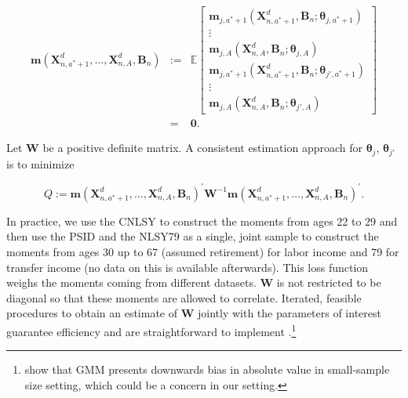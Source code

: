 \begin{eqnarray}
\bm{m} \left( \bm{X}_{n,a^*+1}^d, \ldots,  \bm{X}_{n,A}^d, \bm{B}_{n} \right) &:=& \mathbb{E}
\begin{bmatrix}
\bm{m}_{j,a^*+1} \left( \bm{X}_{n,a^*+1}^d, \bm{B}_{n}; \bm{\theta}_{j,a^*+1} \right) \\ \vdots \\  \bm{m}_{j,A} \left( \bm{X}_{n,A}^d, \bm{B}_{n}; \bm{\theta}_{j,A} \right) \\ \bm{m}_{j,a^*+1} \left( \bm{X}_{n,a^*+1}^d, \bm{B}_{n}; \bm{\theta}_{j',a^*+1} \right) \\ \vdots \\  \bm{m}_{j,A} \left( \bm{X}_{n,A}^d, \bm{B}_{n}; \bm{\theta}_{j',A} \right)
\end{bmatrix}  \\ \nonumber
&=& \bm{0}.
\end{eqnarray}

\noindent Let $\bm{W}$ be a positive definite matrix. A consistent estimation approach for $\bm{\theta}_{j}$, $\bm{\theta}_{j'}$ is to minimize 

\begin{equation}
Q :=  {\bm{m} \left( \bm{X}_{n,a^*+1}^d, \ldots,  \bm{X}_{n,A}^d, \bm{B}_{n} \right)}^{'} \bm{W} ^{-1} {\bm{m} \left( \bm{X}_{n,a^*+1}^d, \ldots,  \bm{X}_{n,A}^d, \bm{B}_{n} \right)^{'}}. \label{eq:wloss}
\end{equation}

\noindent In practice, we use the CNLSY to construct the moments from ages 22 to 29 and then use the PSID and the NLSY79 as a single, joint sample to construct the moments from ages 30 up to 67 (assumed retirement) for labor income and 79 for transfer income (no data on this is available afterwards). This loss function weighs the moments coming from different datasets. $\bm{W}$ is not restricted to be diagonal so that these moments are allowed to correlate. Iterated, feasible procedures to obtain an estimate of $\bm{W}$ jointly with the parameters of interest guarantee efficiency and are straightforward to implement \citep{Hansen_1982_Econometrica,Amemiya_1985_advanced}.\footnote{\citet{Altonji_Segal_1996_JoBaES} show that GMM presents downwards bias in absolute value in small-sample size setting, which could be a concern in our setting.} 












\singlespace






